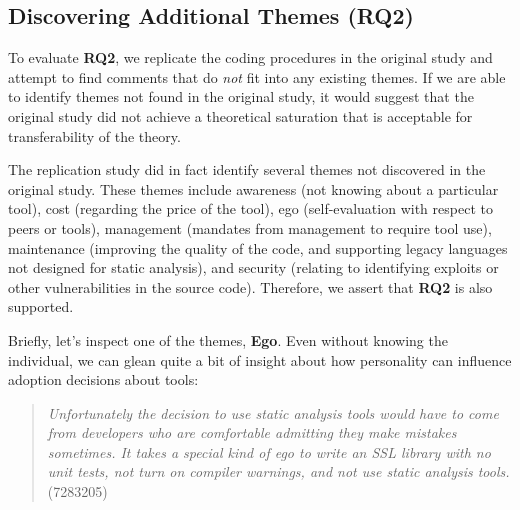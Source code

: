 \documentclass{sig-alternate}
\begin{document}
\subsection{Discovering Additional Themes (RQ2)}

To evaluate \textbf{RQ2}, we replicate the coding procedures in the original study and attempt to find comments that do \textit{not} fit into any existing themes. If we are able to identify themes not found in the original study, it would suggest that the original study did not achieve a theoretical saturation that is acceptable for transferability of the theory.

The replication study did in fact identify several themes not discovered in the original study. These themes include awareness (not knowing about a particular tool), cost (regarding the price of the tool), ego (self-evaluation with respect to peers or tools), management (mandates from management to require tool use), maintenance (improving the quality of the code, and supporting legacy languages not designed for static analysis), and security (relating to identifying exploits or other vulnerabilities in the source code). Therefore, we assert that \textbf{RQ2} is also supported.

Briefly, let's inspect one of the themes, \textbf{Ego}. Even without knowing the individual, we can glean quite a bit of insight about how personality can influence adoption decisions about tools:

\begin{quote}
\textit{Unfortunately the decision to use static analysis tools would have to come from developers who are comfortable admitting they make mistakes sometimes. It takes a special kind of ego to write an SSL library with no unit tests, not turn on compiler warnings, and not use static analysis tools.} (7283205)
\end{quote}


\end{document}
